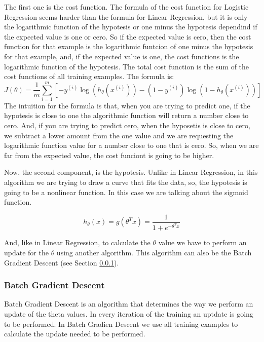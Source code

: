\documentclass[12pt]{article}
\begin{document}
The first one is the cost function. The formula of the cost function for Logistic Regression seems harder than the formula for Linear Regression, but it is only the logarithmic function of the hypotesis or one minus the hypotesis dependind if the expected value is one or cero. So if the expected value is cero, then the cost function for that example is the logarithmic funtcion of one minus the hypotesis for that example, and, if the expected value is one, the cost functions is the logarithmic function of the hypotesis. The total cost function is the sum of the cost functions of all training examples. The formula is:
\begin{equation}
  J(\theta)=\frac{1}{m} \displaystyle\sum_{i=1}^{m} [-y^{(i)}\log(h_{\theta}(x^{(i)}))-(1-y^{(i)})\log(1 -h_{\theta}(x^{(i)}))]
\end{equation}
 The intuition for the formula is that, when you are trying to predict one, if the hypotesis is close to one the algorithmic function will return a number close to cero. And, if you are trying to predict cero, when the hyposetis is close to cero, we subtract a lower amount from the one value and we are requesting the logarithmic function value for a number close to one that is cero. So, when we are far from the expected value, the cost funciont is going to be higher.
 
 Now, the second component, is the hypotesis. Unlike in Linear Regression, in this algorithm we are trying to draw a curve that fits the data, so, the hypotesis is going to be a nonlinear function. In this case we are talking about the sigmoid function.
 
 \begin{equation}
  h_{\theta}(x)=g(\theta^Tx)=\frac{1}{1+e^{-\theta^Tx}}
\end{equation}

 And, like in Linear Regression, to calculate the $\theta$ value we have to perform an update for the $\theta$ using another algorithm. This algorithm can also be the Batch Gradient Descent (see Section \ref{sec:Gradient}).
\subsubsection{Batch Gradient Descent}
\label{sec:Gradient}
Batch Gradient Descent is an algorithm that determines the way we perform an update of the theta values. In every iteration of the training an uptdate is going to be performed. In Batch Gradien Descent we use all training examples to calculate the update needed to be performed. 
\end{document}
